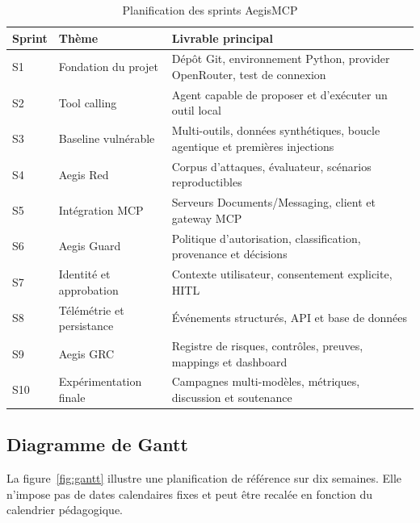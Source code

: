 \begin{table}[H]
\centering
\caption{Planification des sprints AegisMCP}
\label{tab:sprints}
\begin{tabularx}{\textwidth}{p{1.3cm} p{4.2cm} X}
\toprule
\textbf{Sprint} & \textbf{Thème} & \textbf{Livrable principal} \\
\midrule
S1 & Fondation du projet & Dépôt Git, environnement Python, provider OpenRouter, test de connexion \\
S2 & Tool calling & Agent capable de proposer et d'exécuter un outil local \\
S3 & Baseline vulnérable & Multi-outils, données synthétiques, boucle agentique et premières injections \\
S4 & Aegis Red & Corpus d'attaques, évaluateur, scénarios reproductibles \\
S5 & Intégration MCP & Serveurs Documents/Messaging, client et gateway MCP \\
S6 & Aegis Guard & Politique d'autorisation, classification, provenance et décisions \\
S7 & Identité et approbation & Contexte utilisateur, consentement explicite, HITL \\
S8 & Télémétrie et persistance & Événements structurés, API et base de données \\
S9 & Aegis GRC & Registre de risques, contrôles, preuves, mappings et dashboard \\
S10 & Expérimentation finale & Campagnes multi-modèles, métriques, discussion et soutenance \\
\bottomrule
\end{tabularx}
\end{table}

\subsection{Diagramme de Gantt}

La figure~\ref{fig:gantt} illustre une planification de référence sur dix semaines. Elle n'impose pas de dates calendaires fixes et peut être recalée en fonction du calendrier pédagogique.

